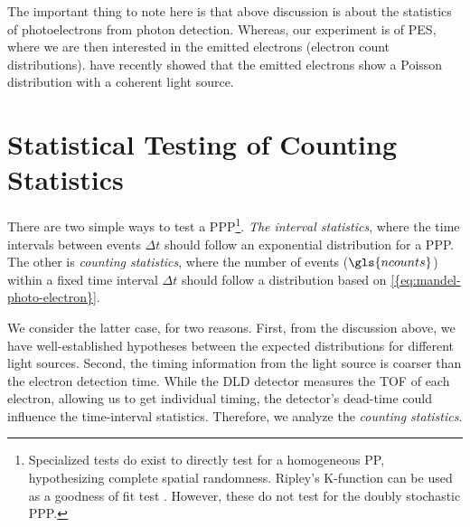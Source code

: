 The important thing to note here is that above discussion is about the statistics of photoelectrons from photon detection. Whereas, our experiment is of \gls{PES}, where we are then interested in the emitted electrons (electron count distributions). \citeauthor{heimerlMultiphotonElectronEmission2024} \cite{heimerlMultiphotonElectronEmission2024} have recently showed that the emitted electrons show a Poisson distribution with a coherent light source. 

\section{Statistical Testing of Counting Statistics}
There are two simple ways to test a \gls{PPP}\footnote{Specialized tests do exist to directly test for a homogeneous \gls{PP}, hypothesizing complete spatial randomness. Ripley's K-function can be used as a goodness of fit test \cite[Section~2.6.4]{chiuStochasticGeometryIts2013}. However, these do not test for the doubly stochastic \gls{PPP}.}. \textit{The interval statistics}, where the time intervals between events $\Delta t$ should follow an exponential distribution for a \gls{PPP}. The other is \textit{counting statistics}, where the number of events ($\gls{ncounts}$) within a fixed time interval $\Delta t$ should follow a distribution based on \cref{{eq:mandel-photo-electron}}.

We consider the latter case, for two reasons. First, from the discussion above, we have well-established hypotheses between the expected distributions for different light sources. Second, the timing information from the light source is coarser than the electron detection time. While the \gls{DLD} detector measures the \gls{TOF} of each electron, allowing us to get individual timing, the detector's dead-time could influence the time-interval statistics. Therefore, we analyze the \textit{counting statistics}.

